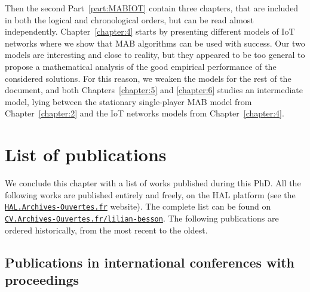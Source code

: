 Then the second Part~\ref{part:MABIOT} contain three chapters, that are included in both the logical and chronological orders, but can be read almost independently.
Chapter~\ref{chapter:4} starts by presenting different models of IoT networks where we show that MAB algorithms can be used with success. Our two models are interesting and close to reality, but they appeared to be too general to propose a mathematical analysis of the good empirical performance of the considered solutions.
For this reason, we weaken the models for the rest of the document,
and both Chapters~\ref{chapter:5} and \ref{chapter:6} studies an intermediate model, lying between the stationary single-player MAB model from Chapter~\ref{chapter:2} and the IoT networks models from Chapter~\ref{chapter:4}.




\section{List of publications}
\label{sec:1:listPublications}

We conclude this chapter with a list of works published during this PhD.
All the following works are published entirely and freely, on the HAL platform (see the \href{https://hal.archives-ouvertes.fr/}{\texttt{HAL.Archives-Ouvertes.fr}} website).
The complete list can be found on
\href{https://cv.archives-ouvertes.fr/lilian-besson/}{\texttt{CV.Archives-Ouvertes.fr/lilian-besson}}.
%
The following publications are ordered historically, from the most recent to the oldest.


\subsection*{Publications in international conferences with proceedings}

